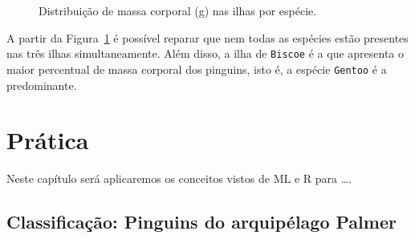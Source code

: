 \documentclass[
  12pt,
  letterpaper,
  DIV=11,
  numbers=noendperiod]{scrreprt}
\theoremstyle{definition}
\theoremstyle{exemplo}
\begin{document}
\begin{figure}[H]


\caption{\label{fig-massa-ilha}Distribuição de massa corporal (g) nas
ilhas por espécie.}

\end{figure}%

\noindent A partir da Figura~\ref{fig-massa-ilha} é possível reparar que
nem todas as espécies estão presentes nas três ilhas simultaneamente.
Além disso, a ilha de \texttt{Biscoe} é a que apresenta o maior
percentual de massa corporal dos pinguins, isto é, a espécie
\texttt{Gentoo} é a predominante.


\chapter{Prática}\label{pruxe1tica}

Neste capítulo será aplicaremos os conceitos vistos de ML e R para
\ldots.

\section{Classificação: Pinguins do arquipélago
Palmer}\label{classificauxe7uxe3o-pinguins-do-arquipuxe9lago-palmer}
\end{document}
